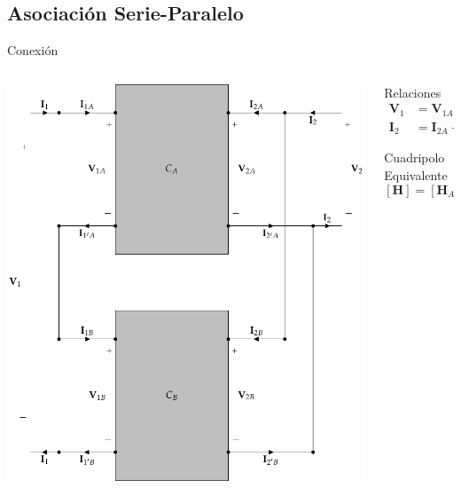 \documentclass[xcolor={usenames,svgnames,dvipsnames}]{beamer}
\begin{document}
\subsection{Asociación Serie-Paralelo}
\label{sec:orgbd10eb0}
\begin{frame}[label={sec:orgde2eca9}]{Conexión}
\begin{columns}
\begin{column}{0.7\columnwidth}
\begin{center}
\includegraphics[height=0.75\textheight]{../figs/serie-paralelo.pdf}
\end{center}
\end{column}
\begin{column}{0.35\columnwidth}
\begin{block}{Relaciones}
\begin{align*}
  \mathbf{V}_1 &= \mathbf{V}_{1A} + \mathbf{V}_{1B}\\
  \mathbf{I}_2 &= \mathbf{I}_{2A} + \mathbf{I}_{2B}
\end{align*}
\end{block}

\begin{block}{Cuadripolo Equivalente}
\[
  \boxed{[\mathbf{H}] = [\mathbf{H}_A] + [\mathbf{H}_B]}
\]
\end{block}
\end{column}
\end{columns}
\end{frame}
\end{document}
